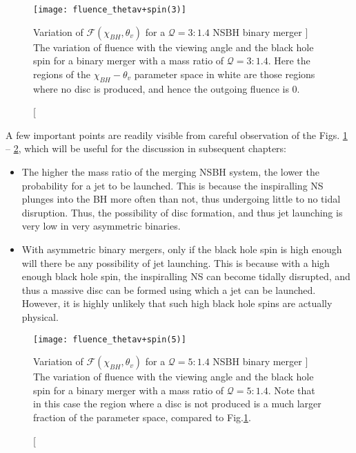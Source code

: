     \begin{figure}[H]
        \centering
        \texttt{[image: fluence\_thetav+spin(3)]}
        \caption
        [
            Variation of $\mathcal{F}(\chi_{BH}, \theta_{v})$ for a $\mathcal{Q}=3:1.4$
            NSBH binary merger
        ]
        {
            The variation of fluence with the viewing angle and the black hole spin for
            a binary merger with a mass ratio of $\mathcal{Q}=3:1.4$. Here the regions
            of the $\chi_{BH}-\theta_v$ parameter space in white are those regions where
            no disc is produced, and hence the outgoing fluence is 0.
        }
        \label{fig:fluence_thetav+spin(3)}
    \end{figure}

    A few important points are readily visible from careful observation of the Figs.
    \ref{fig:fluence_thetav+spin(3)} -- \ref{fig:fluence_thetav+spin(5)}, which will be
    useful for the discussion in subsequent chapters:

    \begin{itemize}

        \item The higher the mass ratio of the merging NSBH system, the lower the
            probability for a jet to be launched. This is because the inspiralling NS
            plunges into the BH more often than not, thus undergoing little to no tidal
            disruption. Thus, the possibility of disc formation, and thus jet launching
            is very low in very asymmetric binaries.

        \item With asymmetric binary mergers, only if the black hole spin is high enough
            will there be any possibility of jet launching. This is because with a high
            enough black hole spin, the inspiralling NS can become tidally disrupted,
            and thus a massive disc can be formed using which a jet can be launched.
            However, it is highly unlikely that such high black hole spins are actually
            physical.

    \end{itemize}

    \begin{figure}[H]
        \centering
        \texttt{[image: fluence\_thetav+spin(5)]}
        \caption
        [
            Variation of $\mathcal{F}(\chi_{BH}, \theta_{v})$ for a $\mathcal{Q}=5:1.4$
            NSBH binary merger
        ]
        {
            The variation of fluence with the viewing angle and the black hole spin for
            a binary merger with a mass ratio of $\mathcal{Q}=5:1.4$. Note that in this
            case the region where a disc is not produced is a much larger fraction of
            the parameter space, compared to Fig.\ref{fig:fluence_thetav+spin(3)}.
        }
        \label{fig:fluence_thetav+spin(5)}
    \end{figure}

